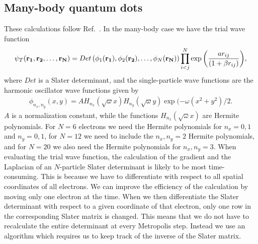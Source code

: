 \documentclass[../main.tex]{subfiles}
\begin{document}
\begin{appendices}
\section{Many-body quantum dots}\label{sec:ClosedFormMany}
These calculations follow Ref.~\cite{FYS4411-LectureNotes}.
In the many-body case we have the trial wave function 
\begin{align}
    \psi_{T}({\bf r_1},{\bf r_2},\dots, {\bf r_N}) = 
   Det\left(\phi_{1}({\bf r_1}),\phi_{2}({\bf r_2}),
   \dots,\phi_{N}({\bf r_N})\right)
   \prod_{i<j}^{N}\exp{\left(\frac{a r_{ij}}{(1+\beta r_{ij})}\right)}, 
\end{align}
where $Det$ is a Slater determinant, and the single-particle wave functions
are the harmonic oscillator wave functions given by
\begin{align}
    \phi_{n_x,n_y}(x,y) = A H_{n_x}(\sqrt{\omega}x)H_{n_y}(\sqrt{\omega}y)\exp{(-\omega(x^2+y^2)/2}.
\end{align}
$A$ is a normalization constant, while the functions $H_{n_x}(\sqrt{\omega}x)$ are Hermite polynomials. For $N=6$ electrons we need the Hermite polynomials for $n_x = 0,1$ and $n_y = 0,1$, for $N=12$ we need to include the $n_x,n_y = 2$ Hermite polynomials, and for $N=20$ we also need the Hermite polynomials for $n_x,n_y = 3$. When evaluating the trial wave function, the calculation of the gradient and the Laplacian of an $N$-particle Slater determinant is likely to be most time-consuming. This is because we have to differentiate with respect to all spatial coordinates of all electrons. We can improve the efficiency of the calculation by moving only one electron at the time. When we then differentiate the Slater determinant with respect to a given coordinate of that electron, only one row in the corresponding Slater matrix is changed. This means that we do not have to recalculate the entire determinant at every Metropolis step. Instead we use an algorithm which requires us to keep track of the inverse of the Slater matrix. 


\end{appendices}
\end{document}
